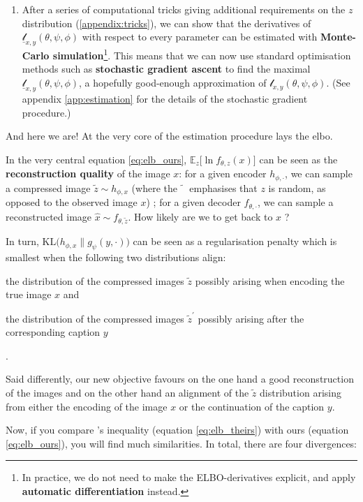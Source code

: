 \documentclass{article}
\begin{document}
\begin{multicols}{2}
\begin{enumerate}
    \item After a series of computational tricks giving additional requirements on the $z$ distribution (\ref{appendix:tricks}), we can show that the derivatives of $\underline{\mathscr{l}}_{x,y}(\theta,\psi,\phi)$ with respect to every parameter can be estimated with \textbf{Monte-Carlo simulation}\footnote{In practice, we do not need to make the ELBO-derivatives explicit, and apply \textbf{automatic differentiation} instead.}. This means that we can now use standard optimisation methods such as \textbf{stochastic gradient ascent} to find the maximal $\underline{\mathscr{l}}_{x,y}(\theta,\psi,\phi)$, a hopefully good-enough approximation of $\mathscr{l}_{x,y}(\theta,\psi,\phi)$. (See appendix  \ref{app:estimation} for the details of the stochastic gradient procedure.)
\end{enumerate}

And here we are! At the very core of the estimation procedure lays the \gls{elbo}.

In the very central equation \ref{eq:elb_ours}, $\mathbb{E}_z \Big[\ln f_{\theta,z}(x)\Big]$ can be seen as the \textbf{reconstruction quality} of the image $x$: for a given encoder $h_{\phi,\cdot}$,  we can sample a compressed image $\tilde z\sim h_{\phi,x}$ (where the $\tilde{\phantom{x}}$ emphasises that $z$ is random, as opposed to the observed image $x$) ; for a given decoder $f_{\theta,\cdot}$, we can sample a reconstructed image $\hat x\sim f_{\theta,\tilde z}$. How likely are we to get back to $x$ ?

In turn, $\textrm{KL}\Big( h_{\phi,x} \| g_\psi(y,\cdot) \Big)$ can be seen as a regularisation penalty which is smallest when the following two distributions align: \begin{enumerate*}[label=(\roman*)] \item the distribution of the compressed images $\tilde z$ possibly arising when encoding the true image $x$ and \item the distribution of the compressed images $\tilde z^\prime$ possibly arising after the corresponding caption $y$\end{enumerate*}.

Said differently, our new objective favours on the one hand a good reconstruction of the images and on the other hand an alignment of the $\tilde z$ distribution arising from either the encoding of the image $x$ or the continuation of the caption $y$.

Now, if you compare \citeauthor{zeroshot}'s inequality (equation \ref{eq:elb_theirs}) with ours (equation \ref{eq:elb_ours}), you will find much similarities. In total, there are four divergences:


\end{multicols}
\end{document}
